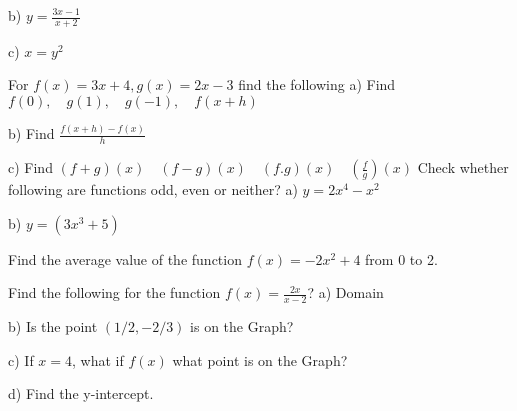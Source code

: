 \documentclass{exam}
\begin{document}
\begin{questions}
	\subitem b) \(y=\frac{3x-1}{x+2}\)
	\hfill \hfill\enspace\hrulefill 
	
	\subitem c) \(x=y^2\)
	\hfill \hfill\enspace\hrulefill 
	\clearpage
	
	\question For \(f(x)=3x+4, g(x)=2x-3\) find the following
	\subitem a) Find \(f(0), \quad g(1), \quad g(-1), \quad f(x+h)\)
	\hfill\enspace\hrulefill 
	
	\subitem b) Find \(\frac{f(x+h)-f(x)}{h}\) 
	\hfill\enspace\hrulefill 
	
	\subitem c) Find \((f+g)(x)\quad (f-g)(x) \quad (f. g)(x)\quad (\frac{f}{g})(x)\) 
	\hfill\enspace\hrulefill 
	\clearpage
	\question Check whether following are functions odd, even or neither?  
	\subitem a) \(y=2x^4-x^2\)   \hfill \hfill\enspace\hrulefill 
	
	\subitem b) \(y=(3x^3+5)\)
	\hfill \hfill\enspace\hrulefill 
	
	
	\question Find the average value of the function \(f(x)=-2x^2+4\) from 0 to 2.
	\hfill\enspace\hrulefill 
	
	\clearpage
	\question Find the following for the function \(f(x)=\frac{2x}{x-2}\)?  
	\subitem a) Domain  \hfill \hfill\enspace\hrulefill 
	
	\subitem b) Is the point \((1/2, -2/3) \) is on the Graph?
	\hfill \hfill\enspace\hrulefill 
	
	\subitem c) If \(x=4\), what if \(f(x)\) what point is on the Graph?
	\hfill \hfill\enspace\hrulefill 
	
	\subitem d) Find the y-intercept.
	\hfill \hfill\enspace\hrulefill 
\end{questions}
\clearpage
\end{document}
